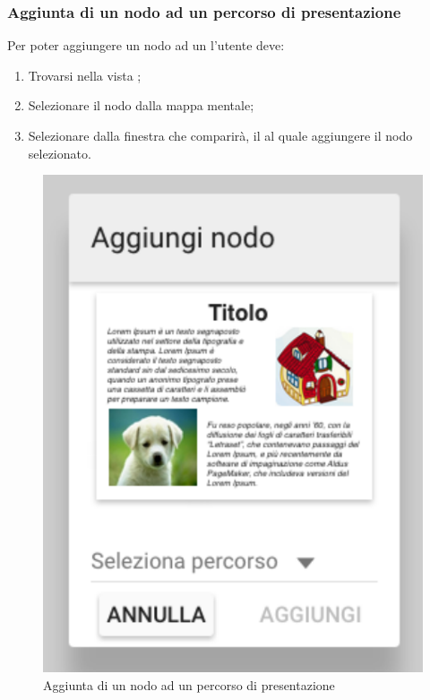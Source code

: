 \subsubsection{Aggiunta di un nodo ad un percorso di presentazione}
Per poter aggiungere un nodo ad un  l'utente deve:
\begin{enumerate}
\item Trovarsi nella vista \textbf{};
\item Selezionare il nodo dalla mappa mentale;
\item Selezionare dalla finestra che comparirà, il  al quale aggiungere il nodo selezionato.
\end{enumerate}
\begin{figure}[H]
\centering
\includegraphics[scale=0.6]{immagini/aggiuntaNodoAPercorso2.pdf}
\caption{Aggiunta di un nodo ad un percorso di presentazione}
\end{figure}
